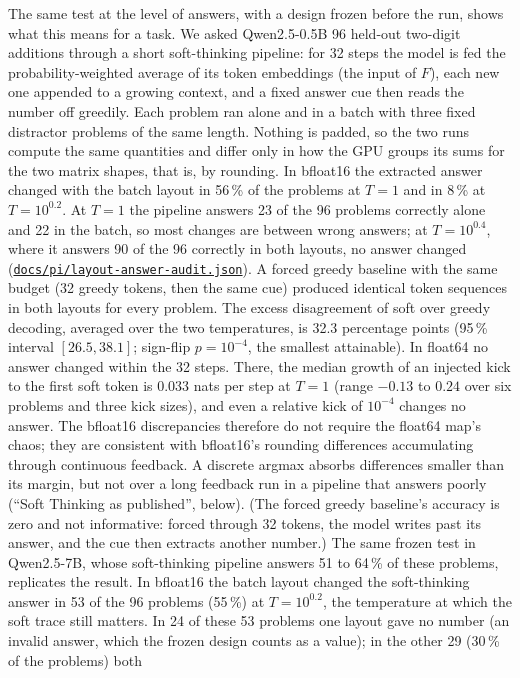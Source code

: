\documentclass[11pt,letterpaper]{article}
\newcommand{\repourl}{https://github.com/tdj28/neural-shrimp}
\newcommand{\reporef}{arxiv-v1}
\newcommand{\repo}[1]{\href{\repourl/blob/\reporef/#1}{\nolinkurl{#1}}}
\begin{document}
The same test at the level of answers, with a design frozen before the run, shows what this means for a task. We
asked Qwen2.5-0.5B 96 held-out two-digit additions through a short soft-thinking pipeline: for 32 steps the model is
fed the probability-weighted average of its token embeddings (the input of $F$), each new one appended to a growing
context, and a fixed answer cue then reads the number off greedily. Each problem ran alone and in a batch with three
fixed distractor problems of the same length. Nothing is padded, so the two runs compute the same quantities and differ
only in how the GPU groups its sums for the two matrix shapes, that is, by rounding. In bfloat16 the extracted answer changed with the batch layout in 56\,\% of the problems at $T=1$ and in
8\,\% at $T=10^{0.2}$. At $T=1$ the pipeline answers 23 of the 96 problems correctly alone and 22 in the batch, so
most changes are between wrong answers; at $T=10^{0.4}$, where it answers 90 of the 96 correctly in both layouts, no
answer changed (\repo{docs/pi/layout-answer-audit.json}). A forced greedy baseline with the same budget (32 greedy tokens, then the same cue) produced
identical token sequences in both layouts for every problem. The excess disagreement of soft over greedy decoding,
averaged over the two temperatures, is 32.3 percentage points (95\,\% interval $[26.5,38.1]$; sign-flip $p=10^{-4}$,
the smallest attainable). In float64 no answer changed within the 32 steps. There, the median growth of an injected
kick to the first soft token is $0.033$ nats per step at $T=1$ (range $-0.13$ to $0.24$ over six problems and three
kick sizes), and even a relative kick of $10^{-4}$ changes no answer. The bfloat16 discrepancies therefore do not
require the float64 map's chaos; they are consistent with bfloat16's rounding differences accumulating through
continuous feedback. A discrete argmax absorbs differences smaller than its margin, but not over a long feedback run in a pipeline that answers poorly (``Soft Thinking as published'', below). (The forced greedy baseline's accuracy is zero and not
informative: forced through 32 tokens, the model writes past its answer, and the cue then extracts another number.)
The same frozen test in Qwen2.5-7B, whose soft-thinking pipeline answers 51 to 64\,\% of these problems, replicates
the result. In bfloat16 the batch layout changed the soft-thinking answer in 53 of the 96 problems (55\,\%) at
$T=10^{0.2}$, the temperature at which the soft trace still matters. In 24 of these 53 problems one layout gave no
number (an invalid answer, which the frozen design counts as a value); in the other 29 (30\,\% of the problems) both
\end{document}

